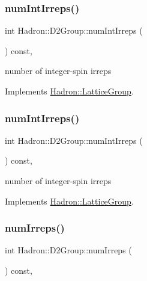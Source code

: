 \subsubsection{\texorpdfstring{numIntIrreps()}{numIntIrreps()}\hspace{0.1cm}{\footnotesize\ttfamily [2/3]}}
{\footnotesize\ttfamily int Hadron\+::\+D2\+Group\+::num\+Int\+Irreps (\begin{DoxyParamCaption}{ }\end{DoxyParamCaption}) const\hspace{0.3cm}{\ttfamily [inline]}, {\ttfamily [virtual]}}

number of integer-\/spin irreps 

Implements \mbox{\hyperlink{structHadron_1_1LatticeGroup_af2aa7b39222bf188389356eefcef7547}{Hadron\+::\+Lattice\+Group}}.

\mbox{\label{structHadron_1_1D2Group_a15d5aa6a889d3e0f27c3f2796d7157ae}} 
\subsubsection{\texorpdfstring{numIntIrreps()}{numIntIrreps()}\hspace{0.1cm}{\footnotesize\ttfamily [3/3]}}
{\footnotesize\ttfamily int Hadron\+::\+D2\+Group\+::num\+Int\+Irreps (\begin{DoxyParamCaption}{ }\end{DoxyParamCaption}) const\hspace{0.3cm}{\ttfamily [inline]}, {\ttfamily [virtual]}}

number of integer-\/spin irreps 

Implements \mbox{\hyperlink{structHadron_1_1LatticeGroup_af2aa7b39222bf188389356eefcef7547}{Hadron\+::\+Lattice\+Group}}.

\mbox{\label{structHadron_1_1D2Group_a24644ff5f0fc06adeb26457c9ce772a5}} 
\subsubsection{\texorpdfstring{numIrreps()}{numIrreps()}\hspace{0.1cm}{\footnotesize\ttfamily [1/3]}}
{\footnotesize\ttfamily int Hadron\+::\+D2\+Group\+::num\+Irreps (\begin{DoxyParamCaption}{ }\end{DoxyParamCaption}) const\hspace{0.3cm}{\ttfamily [inline]}, {\ttfamily [virtual]}}

